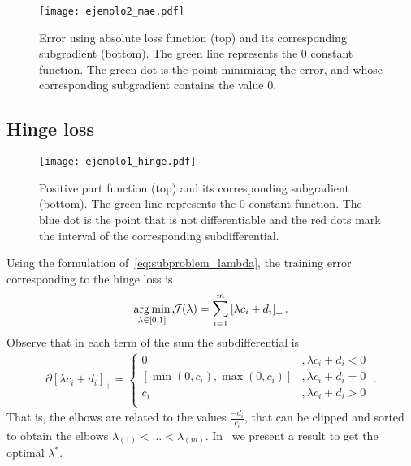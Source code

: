 \begin{figure}[t!]
    \centering
    \texttt{[image: ejemplo2\_mae.pdf]}
    \caption{Error using absolute loss function (top) and its corresponding subgradient (bottom). The green line represents the $0$ constant function. The green dot is the point minimizing the error, and whose corresponding subgradient contains the value $0$.}
    \label{fig:abs_error}
\end{figure}

\subsection{Hinge loss}
\begin{figure}[t!]
    \centering
    \texttt{[image: ejemplo1\_hinge.pdf]}
    \caption{Positive part function (top) and its corresponding subgradient (bottom). The green line represents the $0$ constant function. The blue dot is the point that is not differentiable and the red dots mark the interval of the corresponding subdifferential.}
    \label{fig:hinge_loss}
\end{figure}
Using the formulation of~\eqref{eq:subproblem_lambda}, the training error corresponding to the hinge loss is
\begin{equation}
    \label{eq:opt_hinge_l1}
    \argmin_{\lambda \in [0, 1]} \mathcal{J}(\lambda) = \sum_{i=1}^{\npertask} \pospart{\lambda c_i + d_i}.
\end{equation}
Observe that in each term of the sum the subdifferential is 
\begin{align*}
    \partial \left[\lambda c_i + d_i \right]_+ = 
    \begin{cases}
        0 &, \lambda c_i + d_i  < 0 \\
        [\min(0, c_i), \max(0, c_i)] &, \lambda c_i + d_i  = 0 \\
        c_i &, \lambda c_i + d_i  > 0 \\
    \end{cases} \; .
\end{align*}
That is, the elbows are related to the values $\frac{-d_i}{c_i}$, that can be clipped and sorted to obtain the elbows ${\lambda}_{(1)} < \ldots < {\lambda}_{(m)}$.
In~\citet[Proposition 2]{RuizAD21} we present a result to get the optimal $\lambda^*$.
